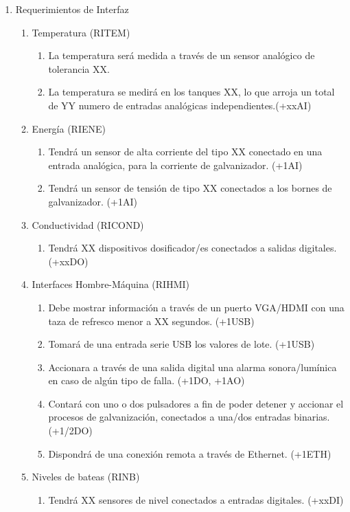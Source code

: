 \begin{enumerate}
\item Requerimientos de Interfaz
\begin{enumerate}

\item Temperatura (RITEM)
\begin{enumerate}
\item La temperatura será medida a través de un sensor analógico de tolerancia XX.
\item La temperatura se medirá en los tanques XX, lo que arroja un total de YY numero de entradas analógicas independientes.(+xxAI)
\end{enumerate}

\item Energía (RIENE)
\begin{enumerate}
\item Tendrá un sensor de alta corriente del tipo XX conectado en una entrada analógica, para la corriente de galvanizador. (+1AI)
\item Tendrá un sensor de tensión de tipo XX conectados a los bornes de galvanizador. (+1AI)
\end{enumerate}

\item Conductividad (RICOND)
\begin{enumerate}
\item Tendrá XX dispositivos dosificador/es conectados a salidas digitales. (+xxDO)
\end{enumerate}

\item Interfaces Hombre-Máquina (RIHMI)
\begin{enumerate}
\item Debe mostrar información a través de un puerto VGA/HDMI con una taza de refresco menor a XX segundos. (+1USB)
\item Tomará de una entrada serie USB los valores de lote. (+1USB)
\item Accionara a través de una salida digital una alarma sonora/lumínica en caso de algún tipo de falla. (+1DO, +1AO) 
\item Contará con uno o dos pulsadores a fin de poder detener y accionar el procesos de galvanización, conectados a una/dos entradas binarias.(+1/2DO)
\item Dispondrá de una conexión remota a través de Ethernet. (+1ETH)
\end{enumerate}

\item Niveles de bateas (RINB)
\begin{enumerate}
\item Tendrá XX sensores de nivel conectados a entradas digitales. (+xxDI)
\end{enumerate}


\end{enumerate}
\end{enumerate}
